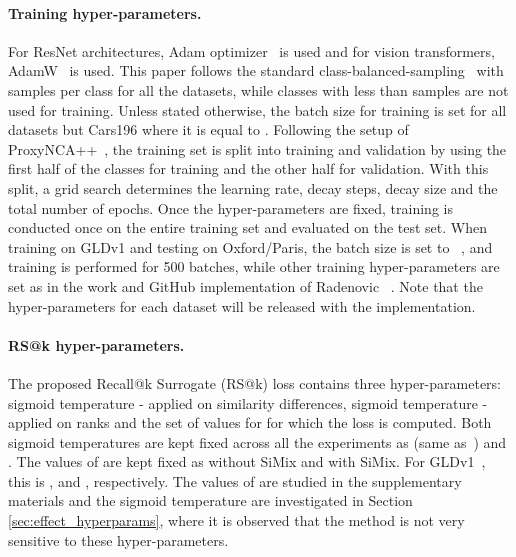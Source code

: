 \paragraph{Training hyper-parameters.} For ResNet architectures, Adam optimizer~\cite{kb15} is used and for vision transformers, AdamW~\cite{lh+19} is used. This paper follows the standard class-balanced-sampling~\cite{mbl20,bxk+20,tdt20} with  samples per class for all the datasets, while classes with less than  samples are not used for training. Unless stated otherwise, the batch size for training is set  for all datasets but Cars196 where it is equal to . Following the setup of ProxyNCA++~\cite{tdt20}, the training set is split into training and validation by using the first half of the classes for training and the other half for validation. With this split, a grid search determines the learning rate, decay steps, decay size and the total number of epochs. Once the hyper-parameters are fixed, training is conducted once on the entire training set and evaluated on the test set. When training on GLDv1 and testing on Oxford/Paris, the batch size is set to ~\cite{rar+19}, and training is performed for 500 batches, while other training hyper-parameters are set as in the work and GitHub implementation of Radenovic \etal~\cite{rtc19}. Note that the hyper-parameters for each dataset will be released with the implementation.

\paragraph{RS@k hyper-parameters.} The proposed Recall@k Surrogate (RS@k) loss  contains three hyper-parameters: sigmoid temperature  - applied on similarity differences, sigmoid temperature  - applied on ranks and the set of values for  for which the loss is computed. Both sigmoid temperatures are kept fixed across all the experiments as  (same as~\cite{bxk+20}) and . The values of  are kept fixed as  without SiMix and  with SiMix. For GLDv1~\cite{nas+17}, this is , and , respectively. The values of  are studied in the supplementary materials and the sigmoid temperature  are investigated in Section \ref{sec:effect_hyperparams}, where it is observed that the method is not very sensitive to these hyper-parameters. 

